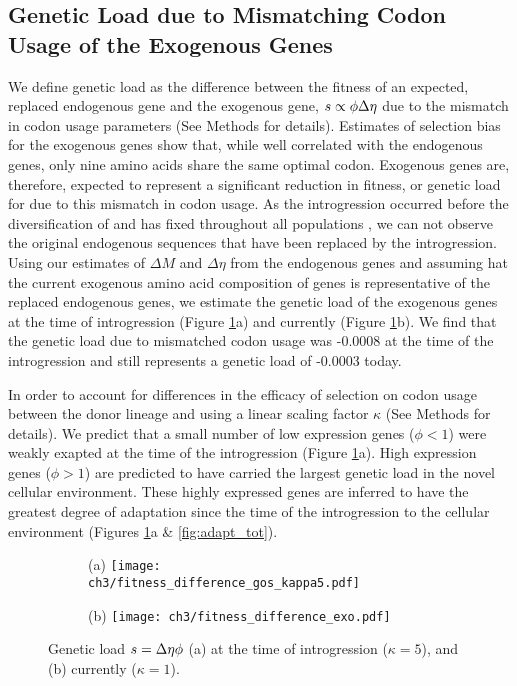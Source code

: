 \subsection{Genetic Load due to Mismatching Codon Usage of the Exogenous Genes}

We define genetic load as the difference between the fitness of an expected, replaced endogenous gene and the exogenous gene, $s \propto \phi {\Delta \eta}$ due to the mismatch in codon usage parameters (See Methods for details).
Estimates of selection bias for the exogenous genes show that, while well correlated with the endogenous genes, only nine amino acids share the same optimal codon.
Exogenous genes are, therefore, expected to represent a significant reduction in fitness, or genetic load for \kluyveri due to this mismatch in codon usage.
As the introgression occurred before the diversification of \kluyveri and has fixed throughout all populations \citep{friedrich2015}, we can not observe the original endogenous sequences that have been replaced by the introgression.
Using our estimates of $\Delta M$ and $\Delta \eta$ from the endogenous genes and assuming hat the current exogenous amino acid composition of genes is representative of the replaced endogenous genes, we estimate the genetic load of the exogenous genes at the time of introgression (Figure \ref{fig:sne_fitness_burden}a) and currently (Figure \ref{fig:sne_fitness_burden}b).
We find that the genetic load due to mismatched codon usage was -0.0008 at the time of the introgression and still represents a genetic load of -0.0003 today.

In order to account for differences in the efficacy of selection on codon usage between the donor lineage and \kluyveri using a linear scaling factor $\kappa$ (See Methods for details).
We predict that a small number of low expression genes ($\phi < 1$) were weakly exapted at the time of the introgression (Figure \ref{fig:sne_fitness_burden}a).
High expression genes ($\phi > 1$) are predicted to have carried the largest genetic load in the novel cellular environment.
These highly expressed genes are inferred to have the greatest degree of adaptation since the time of the introgression to the \kluyveri cellular environment (Figures \ref{fig:sne_fitness_burden}a \& \ref{fig:adapt_tot}).

\begin{figure}
    \centering
    \begin{subfigure}
        \centering
        (a) \texttt{[image: ch3/fitness\_difference\_gos\_kappa5.pdf]}
    \end{subfigure}
    \begin{subfigure}
        \centering
        (b) \texttt{[image: ch3/fitness\_difference\_exo.pdf]}
    \end{subfigure}
    \caption{Genetic load $s = {\Delta \eta} \phi$ (a) at the time of introgression ($\kappa = 5$), and (b) currently ($\kappa = 1$). }
    \label{fig:sne_fitness_burden}
\end{figure}


